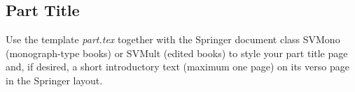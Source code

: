 %
%
%
\begin{english}
\begin{partbacktext}
\part{Part Title}
\noindent Use the template \emph{part.tex} together with the Springer document class SVMono (monograph-type books) or SVMult (edited books) to style your part title page and, if desired, a short introductory text (maximum one page) on its verso page in the Springer layout.

\end{partbacktext}
\end{english}
